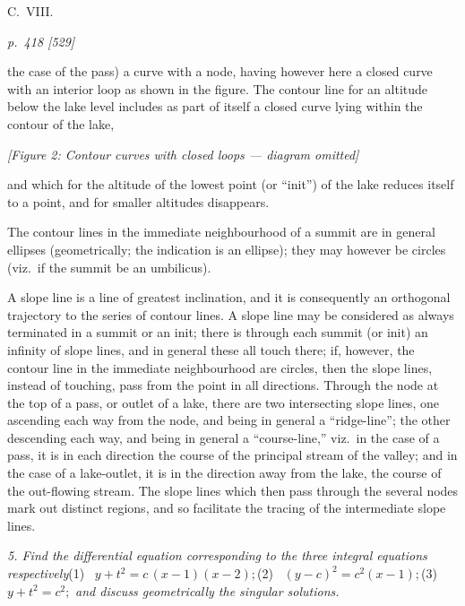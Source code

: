 \documentclass[11pt,a4paper]{book}
\begin{document}
\bigskip
\hfill{\small C.\ VIII.}

\clearpage

\bigskip
\textit{p.~418 [529]}
\smallskip

the case of the pass) a curve with a node, having however here a closed curve with an interior loop as shown in the figure. The contour line for an altitude below the lake level includes as part of itself a closed curve lying within the contour of the lake,

\begin{center}
\textit{[Figure 2: Contour curves with closed loops --- diagram omitted]}
\end{center}

\noindent
and which for the altitude of the lowest point (or ``init'') of the lake reduces itself to a point, and for smaller altitudes disappears.

The contour lines in the immediate neighbourhood of a summit are in general ellipses (geometrically; the indication is an ellipse); they may however be circles (viz.\ if the summit be an umbilicus).

A slope line is a line of greatest inclination, and it is consequently an orthogonal trajectory to the series of contour lines. A slope line may be considered as always terminated in a summit or an init; there is through each summit (or init) an infinity of slope lines, and in general these all touch there; if, however, the contour line in the immediate neighbourhood are circles, then the slope lines, instead of touching, pass from the point in all directions. Through the node at the top of a pass, or outlet of a lake, there are two intersecting slope lines, one ascending each way from the node, and being in general a ``ridge-line''; the other descending each way, and being in general a ``course-line,'' viz.\ in the case of a pass, it is in each direction the course of the principal stream of the valley; and in the case of a lake-outlet, it is in the direction away from the lake, the course of the out-flowing stream. The slope lines which then pass through the several nodes mark out distinct regions, and so facilitate the tracing of the intermediate slope lines.

\textit{5. Find the differential equation corresponding to the three integral equations respectively}\quad (1) \ $y + t^2 = c\,(x - 1)(x - 2);$\quad (2) \ $(y - c)^2 = c^2(x - 1);$\quad {}\quad (3) \ $y + t^2 = c^2;$
\textit{and discuss geometrically the singular solutions.}
\end{document}
